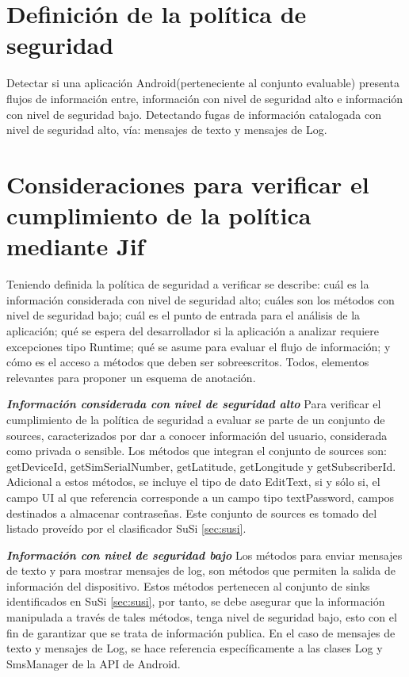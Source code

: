 \section{Definición de la política de seguridad}
\label{subsection:politica}
Detectar si una aplicación Android(perteneciente al conjunto evaluable) presenta
flujos de información entre, información con nivel de seguridad alto e
información con nivel de seguridad bajo.\newline
Detectando fugas de información catalogada con nivel de seguridad alto, vía:
mensajes de texto y mensajes de Log.\newline

\section{Consideraciones para verificar el cumplimiento de la política
mediante Jif}
\label{subsec:consVerPol}
Teniendo definida la política de seguridad a verificar se describe: cuál es la
información considerada con nivel de seguridad alto; cuáles son los métodos con
nivel de seguridad bajo; cuál es el punto de entrada para el análisis de la aplicación;
qué se espera del desarrollador si la aplicación a analizar requiere excepciones
tipo Runtime; qué se asume para evaluar el flujo de información; y cómo es el
acceso a métodos que deben ser sobreescritos.\newline
Todos, elementos relevantes para proponer un esquema de anotación.

\textit{\textbf{Información considerada con nivel de seguridad alto}}\newline
Para verificar el cumplimiento de la política de seguridad a evaluar se parte de
un conjunto de sources, caracterizados por dar a conocer información del
usuario, considerada como privada o sensible. Los métodos que integran el
conjunto de sources son: getDeviceId, getSimSerialNumber, getLatitude,
getLongitude y getSubscriberId. Adicional a estos métodos, se incluye el tipo de
dato EditText, si y sólo si, el campo UI al que referencia corresponde a un
campo tipo textPassword, campos destinados a almacenar contraseñas.\newline 
Este conjunto de sources es tomado del listado proveído por el clasificador SuSi
\ref{sec:susi}.

\textit{\textbf{Información con nivel de seguridad bajo}}\newline 
Los métodos para enviar mensajes de texto y para mostrar mensajes de log, son
métodos que permiten la salida  de información del dispositivo. 
Estos métodos pertenecen al conjunto de sinks identificados en
SuSi \ref{sec:susi}, por tanto, se debe asegurar que la información manipulada
a través de tales métodos, tenga nivel de seguridad bajo, esto con el fin de
garantizar que se trata de información publica. 
En el caso de mensajes de texto y mensajes de Log, se hace referencia
específicamente a las clases Log y SmsManager de la API de Android.\newline 

